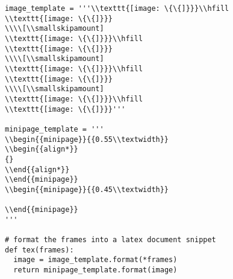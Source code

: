 \begin{verbatim}
image_template = '''\\texttt{[image: \{\{]}}}\\hfill
\\texttt{[image: \{\{]}}}
\\\\[\\smallskipamount]
\\texttt{[image: \{\{]}}}\\hfill
\\texttt{[image: \{\{]}}}
\\\\[\\smallskipamount]
\\texttt{[image: \{\{]}}}\\hfill
\\texttt{[image: \{\{]}}}
\\\\[\\smallskipamount]
\\texttt{[image: \{\{]}}}\\hfill
\\texttt{[image: \{\{]}}}'''

minipage_template = '''
\\begin{{minipage}}{{0.55\\textwidth}}
\\begin{{align*}}
{}
\\end{{align*}}
\\end{{minipage}}
\\begin{{minipage}}{{0.45\\textwidth}}

\\end{{minipage}}
'''

# format the frames into a latex document snippet
def tex(frames):
  image = image_template.format(*frames)
  return minipage_template.format(image)
\end{verbatim}

